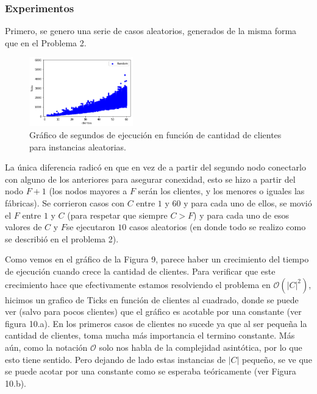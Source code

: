 \documentclass[A4paper,oneside,fleqn,11pt]{article}
\theoremstyle{definition}
\begin{document}
\subsubsection{Experimentos}
Primero, se genero una serie de casos aleatorios, generados de la misma forma que en el Problema 2.
\begin{figure}
\centering
\includegraphics[width=0.4\textwidth]{r1p3.png}
\caption{ Gráfico de segundos de ejecución en función de cantidad de clientes para instancias aleatorias.}
\end{figure}

 La única diferencia radicó en que en vez de a partir del segundo nodo conectarlo con alguno de los anteriores para asegurar conexidad, esto se hizo a partir del nodo $F+1$ (los nodos mayores a $F$ serán los clientes, y los menores o iguales las fábricas). Se corrieron casos con $C$ entre $1$ y $60$ y para cada uno de ellos, se movió el $F$ entre $1$ y $C$ (para respetar que siempre $C>F$) y para cada uno de esos valores de $C$ y $F$se ejecutaron $10$ casos aleatorios (en donde todo se realizo como se describió en el problema 2).

Como vemos en el gráfico de la Figura 9, parece haber un crecimiento del tiempo de ejecución cuando crece la cantidad de clientes. Para verificar que este crecimiento hace que efectivamente estamos resolviendo el problema en $\mathcal{O}(|C|^2)$, hicimos un grafico de Ticks en función de clientes al cuadrado, donde se puede ver (salvo para pocos clientes) que el gráfico es acotable por una constante (ver figura 10.a). En los primeros casos de clientes no sucede ya que al ser pequeña la cantidad de clientes, toma mucha más importancia el termino constante. Más aún, como la notación $\mathcal{O}$ solo nos habla de la complejidad asintótica, por lo que esto tiene sentido. Pero dejando de lado estas instancias de $	|C|$ pequeño, se ve que se puede acotar por una constante como se esperaba teóricamente (ver Figura 10.b).

\end{document}
